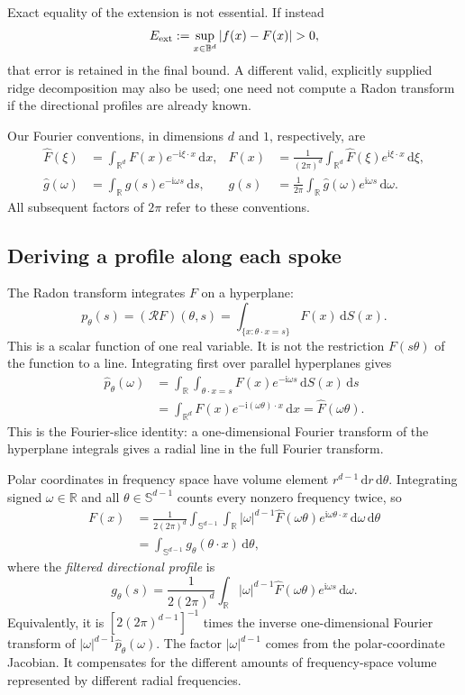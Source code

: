 \documentclass[11pt]{article}
\newcommand{\R}{\mathbb R}
\newcommand{\Sph}{\mathbb S^{d-1}}
\newcommand{\ii}{\mathrm i}
\newcommand{\dd}{\,\mathrm d}
\begin{document}
Exact equality of the extension is not essential. If instead
\[
 E_{\rm ext}:=\sup_{x\in\mathbb B^d}|f(x)-F(x)|>0,
\]
that error is retained in the final bound. A different valid, explicitly supplied ridge decomposition may also be used; one need not compute a Radon transform if the directional profiles are already known.

Our Fourier conventions, in dimensions $d$ and $1$, respectively, are
\begin{align}
 \widehat F(\xi)&=\int_{\R^d}F(x)e^{-\ii\xi\cdot x}\dd x,
 &F(x)&=\frac1{(2\pi)^d}\int_{\R^d}\widehat F(\xi)e^{\ii\xi\cdot x}\dd\xi,
 \label{eq:fourier-d}\\
 \widehat g(\omega)&=\int_\R g(s)e^{-\ii\omega s}\dd s,
 &g(s)&=\frac1{2\pi}\int_\R\widehat g(\omega)e^{\ii\omega s}\dd\omega.
 \label{eq:fourier-one}
\end{align}
All subsequent factors of $2\pi$ refer to these conventions.

\subsection{Deriving a profile along each spoke}

The Radon transform integrates $F$ on a hyperplane:
\begin{equation}
 p_\theta(s)=(\mathcal RF)(\theta,s)
 =\int_{\{x:\theta\cdot x=s\}}F(x)\dd S(x).
 \label{eq:radon}
\end{equation}
This is a scalar function of one real variable. It is not the restriction $F(s\theta)$ of the function to a line. Integrating first over parallel hyperplanes gives
\begin{align*}
 \widehat p_\theta(\omega)
 &=\int_\R\int_{\theta\cdot x=s}F(x)e^{-\ii\omega s}\dd S(x)\dd s\\
 &=\int_{\R^d}F(x)e^{-\ii(\omega\theta)\cdot x}\dd x
 =\widehat F(\omega\theta).
\end{align*}
This is the Fourier-slice identity: a one-dimensional Fourier transform of the hyperplane integrals gives a radial line in the full Fourier transform.

Polar coordinates in frequency space have volume element $r^{d-1}\dd r\dd\theta$. Integrating signed $\omega\in\R$ and all $\theta\in\Sph$ counts every nonzero frequency twice, so
\begin{align}
 F(x)
 &=\frac1{2(2\pi)^d}\int_{\Sph}\int_\R
 |\omega|^{d-1}\widehat F(\omega\theta)
 e^{\ii\omega\theta\cdot x}\dd\omega\dd\theta\\
 &=\int_{\Sph}g_\theta(\theta\cdot x)\dd\theta,
 \label{eq:ridge-integral}
\end{align}
where the \emph{filtered directional profile} is
\begin{equation}
 \boxed{g_\theta(s)=\frac1{2(2\pi)^d}\int_\R
 |\omega|^{d-1}\widehat F(\omega\theta)e^{\ii\omega s}\dd\omega.}
 \label{eq:profile}
\end{equation}
Equivalently, it is $[2(2\pi)^{d-1}]^{-1}$ times the inverse one-dimensional Fourier transform of $|\omega|^{d-1}\widehat p_\theta(\omega)$. The factor $|\omega|^{d-1}$ comes from the polar-coordinate Jacobian. It compensates for the different amounts of frequency-space volume represented by different radial frequencies.
\end{document}
